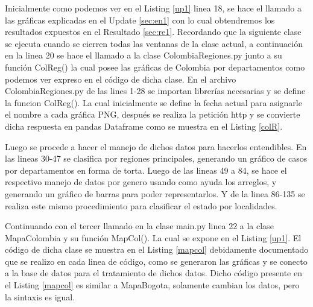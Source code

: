 \documentclass[conference,compsoc,onecolumn]{IEEEtran}
\begin{document}




Inicialmente como podemos ver en el Listing \ref{up1} linea 18, se hace el llamado a las gráficas explicadas en el Update \ref{sec:en1} con lo cual obtendremos los resultados expuestos en el Resultado \ref{sec:re1}. Recordando que la siguiente clase se ejecuta cuando se cierren todas las ventanas de la clase actual, a continuación en la linea 20 se hace el llamado a la clase ColombiaRegiones.py junto a su función ColReg() la cual posee las gráficas de Colombia por departamentos como podemos ver expreso en el código de dicha clase.
En el archivo ColombiaRegiones.py de las lines 1-28 se importan librerías necesarias y se define la funcion ColReg(). La cual inicialmente se define la fecha actual para asignarle el nombre a cada gráfica PNG, después se realiza la petición http y se convierte dicha respuesta en pandas Dataframe como se muestra en el Listing \ref{colR}.




Luego se procede a hacer el manejo de dichos datos para hacerlos entendibles. En las lineas 30-47 se clasifica por regiones principales, generando un gráfico de casos por departamentos en forma de torta. Luego de las lineas 49 a 84, se hace el respectivo manejo de datos por genero usando como ayuda los arreglos, y generando un gráfico de barras para poder representarlos. Y de la linea 86-135 se realiza este mismo procedimiento para clasificar el estado por localidades. 



Continuando con el tercer llamado en la clase main.py linea 22 a la clase MapaColombia y su función MapCol(). La cual se expone en el Listing \ref{up1}. El código de dicha clase se muestra en el Listing \ref{mapcol} debidamente documentado que se realizo en cada linea de código, como se generaron las gráficas y se conecto a la base de datos para el tratamiento de dichos datos. 
Dicho código presente en el Listing \ref{mapcol} es similar a MapaBogota, solamente cambian los datos, pero la sintaxis es igual.
\end{document}
